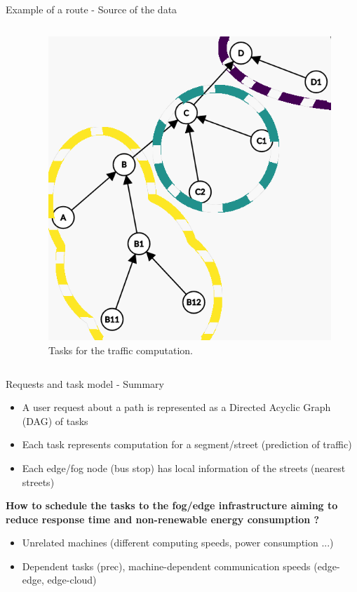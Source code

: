 \documentclass[Ligatures=TeX,table,svgnames,usetotalslideindicator,compress,10pt,aspectratio=169]{beamer}
\begin{document}
\begin{frame}{Example of a route -  Source of the data}
\begin{columns}
\begin{column}{0.5\textwidth}
\end{column}
\begin{column}{0.5\textwidth}
   \begin{figure}[!h]
        \centering
        \includegraphics[width=.9\textwidth]{images/tasks_data.png}
        \caption{Tasks for the traffic computation.}
      \end{figure}
\end{column}

\end{columns}
\end{frame}

\begin{frame}{Requests and task model - Summary}
\begin{itemize}
    \item A user request about a path is represented as a Directed Acyclic Graph (DAG) of tasks
    \item Each task represents computation for a segment/street (prediction of traffic) 
    \item Each edge/fog node (bus stop) has local information of the streets (nearest streets)
    
\end{itemize}

\pause
\textbf{How to schedule the tasks to the fog/edge infrastructure aiming to reduce response time and non-renewable energy consumption ?}

\begin{itemize}
    \item Unrelated machines (different computing speeds, power consumption ...)
    \item Dependent tasks (prec), machine-dependent communication speeds (edge-edge, edge-cloud)
    
\end{itemize}


\end{frame}
\end{document}
